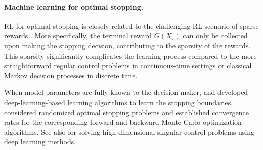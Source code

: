 \documentclass[11pt]{amsart}
\theoremstyle{plain}
\numberwithin{equation}{section}
\begin{document}
\paragraph{\bf Machine learning for optimal stopping.}
RL for optimal stopping is closely related to the challenging RL scenario of sparse rewards \cite{devidze2022exploration,hare2019dealing}. More specifically, the terminal reward 
$G(X_\tau)$ can only be collected upon making the stopping decision, contributing to the sparsity of the rewards. This sparsity significantly complicates the learning process compared to the more straightforward regular control problems in continuous-time settings or classical Markov decision processes in discrete time.

When model parameters are fully known to the decision maker, \cite{reppen2022neural} and \cite{soner2023stopping} developed deep-learning-based learning algorithms to learn the stopping boundaries. \cite{bayer2021randomized} considered randomized optimal stopping problems and
established convergence rates for the corresponding forward and backward Monte Carlo optimization algorithms. See also \cite{ata2023singular}  for solving high-dimensional singular control problems using deep learning methods. 
\end{document}
